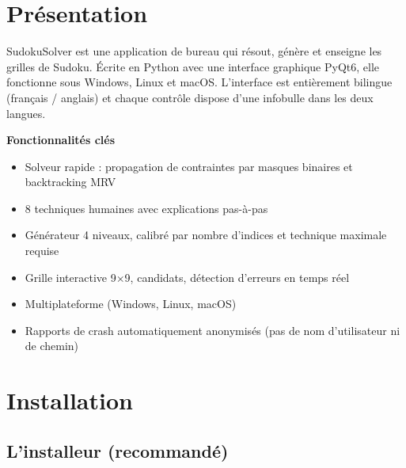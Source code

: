 
\usepackage[french]{babel}
\newcommand{\MANUELTITRE}{Manuel d'utilisation}

\tableofcontents
\newpage
\section{Présentation}

SudokuSolver est une application de bureau qui résout, génère et
enseigne les grilles de Sudoku. Écrite en Python avec une interface
graphique PyQt6, elle fonctionne sous Windows, Linux et macOS.
L'interface est entièrement bilingue (français / anglais) et chaque
contrôle dispose d'une infobulle dans les deux langues.

\begin{infobox}
\textbf{Fonctionnalités clés}
\begin{itemize}
  \item Solveur rapide : propagation de contraintes par masques binaires et backtracking MRV
  \item 8 techniques humaines avec explications pas-à-pas
  \item Générateur 4 niveaux, calibré par nombre d'indices et technique maximale requise
  \item Grille interactive 9$\times$9, candidats, détection d'erreurs en temps réel
  \item Multiplateforme (Windows, Linux, macOS)
  \item Rapports de crash automatiquement anonymisés (pas de nom d'utilisateur ni de chemin)
\end{itemize}
\end{infobox}

\section{Installation}\label{sec:fr-install}

\subsection{L'installeur (recommandé)}

